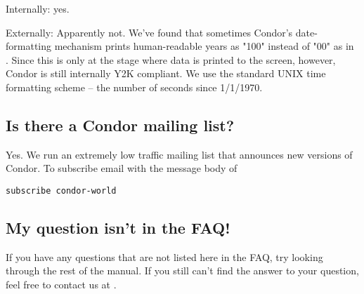Internally:  yes.

Externally:  Apparently not.  We've found that sometimes Condor's
date-formatting mechanism prints human-readable years as "100" instead
of "00" as in .  Since this is only at the
stage where data is printed to the screen, however, Condor is still
internally Y2K compliant.  We use the standard UNIX time formatting
scheme -- the number of seconds since 1/1/1970.

\subsection{Is there a Condor mailing list?}

Yes.  We run an extremely low traffic mailing list that announces new versions of Condor.
To subscribe email
with the message body of
\begin{verbatim}
subscribe condor-world
\end{verbatim}

\subsection{My question isn't in the FAQ!}

If you have any questions that are not listed here in the FAQ, try
looking through the rest of the manual.
If you still can't find the answer to your question, feel free to
contact us at .
